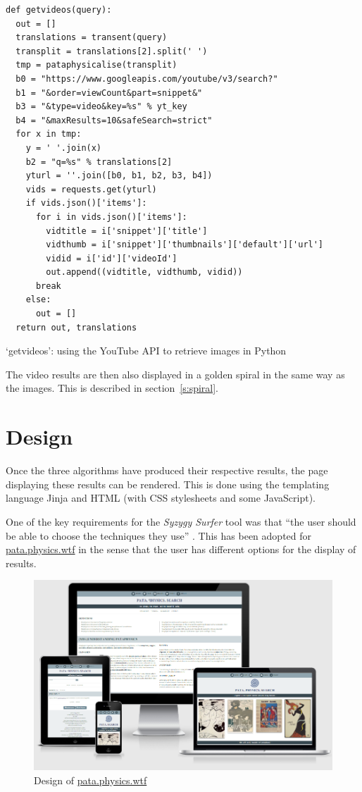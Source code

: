 \begin{listing}
  \begin{verbatim}
def getvideos(query):
  out = []
  translations = transent(query)
  transplit = translations[2].split(' ')
  tmp = pataphysicalise(transplit)
  b0 = "https://www.googleapis.com/youtube/v3/search?"
  b1 = "&order=viewCount&part=snippet&"
  b3 = "&type=video&key=%s" % yt_key
  b4 = "&maxResults=10&safeSearch=strict"
  for x in tmp:
    y = ' '.join(x)
    b2 = "q=%s" % translations[2]
    yturl = ''.join([b0, b1, b2, b3, b4])
    vids = requests.get(yturl)
    if vids.json()['items']:
      for i in vids.json()['items']:
        vidtitle = i['snippet']['title']
        vidthumb = i['snippet']['thumbnails']['default']['url']
        vidid = i['id']['videoId']
        out.append((vidtitle, vidthumb, vidid))
      break
    else:
      out = []
  return out, translations
  \end{verbatim}
\caption[`getvideos' function]{`getvideos': using the YouTube API to retrieve images in Python}
\label{code:videosearch}
\end{listing}

The video results are then also displayed in a golden spiral in the same way as the images. This is described in section~\ref{s:spiral}.


\section{Design}

Once the three algorithms have produced their respective results, the page displaying these results can be rendered. This is done using the templating language Jinja \autocite{Jinja2016} and \ac{HTML} (with \ac{CSS} stylesheets and some JavaScript).

One of the key requirements for the \textit{Syzygy Surfer} tool was that ``the user should be able to choose the techniques they use'' \autocite{Hendler2011}. This has been adopted for \url{pata.physics.wtf} in the sense that the user has different options for the display of results.

\begin{figure}[!htbp] %
  \centering
  \includegraphics[width=\linewidth]{images/proto3screen}
\caption[Design of \url{pata.physics.wtf}]{Design of \url{pata.physics.wtf}}
\label{img:proto3screen}
\end{figure}

